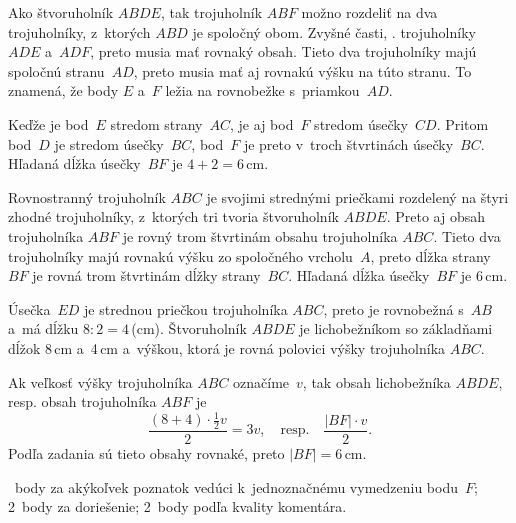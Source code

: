 {%
Ako štvoruholník $ABDE$, tak trojuholník $ABF$ možno rozdeliť na dva trojuholníky, z~ktorých $ABD$ je spoločný obom.
Zvyšné časti, \tj. trojuholníky $ADE$ a~$ADF$, preto musia mať rovnaký obsah.
Tieto dva trojuholníky majú spoločnú stranu~$AD$, preto musia mať aj rovnakú výšku na túto stranu.
To znamená, že body $E$ a~$F$ ležia na rovnobežke s~priamkou~$AD$.

Keďže je bod~$E$ stredom strany~$AC$, je aj bod~$F$ stredom úsečky~$CD$.
Pritom bod~$D$ je stredom úsečky~$BC$, bod~$F$ je preto v~troch štvrtinách úsečky~$BC$.
Hľadaná dĺžka úsečky~$BF$ je $4+2=6$\,cm.
%

\ineriesenie
Rovnostranný trojuholník $ABC$ je svojimi strednými priečkami rozdelený na štyri zhodné trojuholníky, z~ktorých tri tvoria štvoruholník $ABDE$.
Preto aj obsah trojuholníka $ABF$ je rovný trom štvrtinám obsahu trojuholníka $ABC$.
Tieto dva trojuholníky majú rovnakú výšku zo spoločného vrcholu~$A$, preto dĺžka strany~$BF$ je rovná trom štvrtinám dĺžky strany~$BC$.
Hľadaná dĺžka úsečky~$BF$ je 6\,cm.
%

\ineriesenie
Úsečka~$ED$ je strednou priečkou trojuholníka $ABC$, preto je rovnobežná s~$AB$ a~má dĺžku $8:2=4$\,(cm).
Štvoruholník $ABDE$ je lichobežníkom so základňami dĺžok 8\,cm a~4\,cm a~výškou, ktorá je rovná polovici výšky trojuholníka $ABC$.

Ak veľkosť výšky trojuholníka $ABC$ označíme~$v$, tak obsah lichobežníka $ABDE$, resp.
obsah trojuholníka $ABF$ je
$$
\frac{(8+4)\cdot\frac12{v}}2=3 v,
\quad\text{resp.}\quad
\frac{|BF|\cdot v}2.
$$
Podľa zadania sú tieto obsahy rovnaké, preto $|BF|=6$\,cm.

~body za akýkoľvek poznatok vedúci k~jednoznačnému vymedzeniu bodu~$F$;
2~body za doriešenie;
2~body podľa kvality komentára.
\endhodnotenie
}

